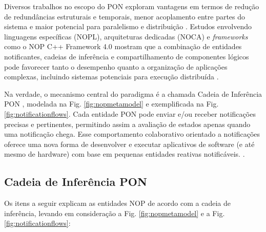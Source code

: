 Diversos trabalhos no escopo do PON exploram vantagens em termos de redução de redundâncias estruturais e temporais, menor acoplamento entre partes do sistema e maior potencial para paralelismo e distribuição \cite{linhares2020,neves2021application}. Estudos envolvendo linguagens específicas (NOPL), arquiteturas dedicadas (NOCA) e \textit{frameworks} como o NOP C++ Framework 4.0 mostram que a combinação de entidades notificantes, cadeias de inferência e compartilhamento de componentes lógicos pode favorecer tanto o desempenho quanto a organização de aplicações complexas, incluindo sistemas potenciais para execução distribuída \cite{linhares2020,neves2021application}. 

Na verdade, o mecanismo central do paradigma é a chamada Cadeia de Inferência PON \citep{peters2012new}, modelada na Fig. \ref{fig:nopmetamodel} e exemplificada na Fig. \ref{fig:notificationflows}.
Cada entidade PON pode enviar e/ou receber notificações precisas e pertinentes, permitindo assim a avaliação de estados apenas quando uma notificação chega.
Esse comportamento colaborativo orientado a notificações oferece uma nova forma de desenvolver e executar aplicativos de software (e até mesmo de hardware) com base em pequenas entidades reativas notificáveis. \citep{linhares2020,simao2012noppicomparison}.

\subsection{Cadeia de Inferência PON}
\label{sec:nopchain}


Os itens a seguir explicam as entidades NOP de acordo com a cadeia de inferência, levando em consideração a Fig. \ref{fig:nopmetamodel} e a Fig. \ref{fig:notificationflows}:

